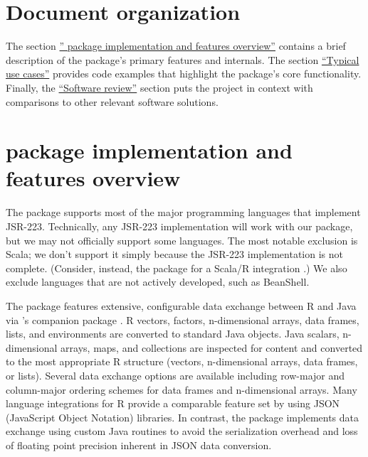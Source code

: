 \section{Document organization}

The section \hyperlink{jsr223-package-implementation-and-features-overview}{'' package implementation and features overview''} contains a brief description of the package's primary features and internals. The section \hyperlink{typical-use-cases}{``Typical use cases''} provides code examples that highlight the  package's core functionality. Finally, the  \hyperlink{software-review}{``Software review''} section puts the  project in context with comparisons to other relevant software solutions.

\hypertarget{jsr223-package-implementation-and-features-overview}{}
\section{ package implementation and features overview}

The  package supports most of the major programming languages that implement JSR-223. Technically, any JSR-223 implementation will work with our package, but we may not officially support some languages. The most notable exclusion is Scala; we don't support it simply because the JSR-223 implementation is not complete. (Consider, instead, the  package for a Scala/R integration \citep{rscala}.) We also exclude languages that are not actively developed, such as BeanShell.

The  package features extensive, configurable data exchange between R and Java via 's companion package  \citep{jdx}. R vectors, factors, n-dimensional arrays, data frames, lists, and environments are converted to standard Java objects. Java scalars, n-dimensional arrays, maps, and collections are inspected for content and converted to the most appropriate R structure (vectors, n-dimensional arrays, data frames, or lists). Several data exchange options are available including row-major and column-major ordering schemes for data frames and n-dimensional arrays. Many language integrations for R provide a comparable feature set by using JSON (JavaScript Object Notation) libraries. In contrast, the  package implements data exchange using custom Java routines to avoid the serialization overhead and loss of floating point precision inherent in JSON data conversion.

